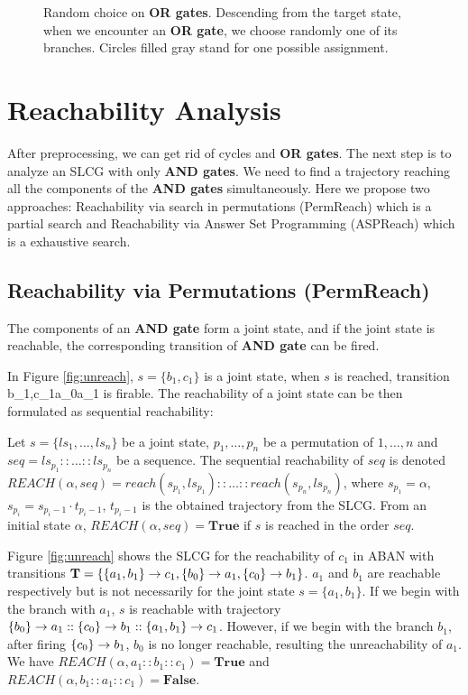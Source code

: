 \begin{figure}[ht]
    \centering
    
    \caption[Random choice on \textbf{OR gates}]{Random choice on \textbf{OR gates}. Descending from the target state, when we encounter an \textbf{OR gate}, we choose randomly one of its branches. Circles filled gray stand for one possible assignment.}
    \label{fig:heuristics}
\end{figure}

\section{Reachability Analysis}
After preprocessing, we can get rid of cycles and \textbf{OR gates}.
The next step is to analyze an SLCG with only \textbf{AND gates}.
We need to find a trajectory reaching all the components of the \textbf{AND gates} simultaneously.
Here we propose two approaches: Reachability via search in permutations (PermReach) which is a partial search and Reachability via Answer Set Programming (ASPReach) which is a exhaustive search.
\subsection{Reachability via Permutations (PermReach)}

The components of an \textbf{AND gate} form a joint state, and if the joint state is reachable, the corresponding transition of \textbf{AND gate} can be fired. 

In Figure \ref{fig:unreach}, $s=\{ b_1,c_1\}$ is a joint state, when $s$ is reached, transition \ac{b_1,c_1}{a_0}{a_1} is firable.
The reachability of a joint state can be then formulated as sequential reachability:
\begin{definition}
Let $s=\{ls_1,\ldots,ls_n\}$ be a joint state, $p_1,\ldots ,p_n$ be a permutation of $1,\ldots ,n$ and $seq=ls_{p_1}::\ldots::ls_{p_n}$ be a sequence.
The sequential reachability of $seq$ is denoted %
$REACH(\alpha,seq)=reach(s_{p_1},ls_{p_1})::\ldots::reach(s_{p_n},ls_{p_n})$, where $s_{p_1}=\alpha$, $s_{p_i}=s_{p_i-1}\cdot t_{p_i-1}$, $t_{p_i-1}$ is the obtained trajectory from the SLCG.
From an initial state $\alpha$, $REACH(\alpha,seq) = \mathbf{True}$ if $s$ is reached in the order $seq$.
\end{definition}

\begin{example}\label{example:order}
Figure \ref{fig:unreach} shows the SLCG for the reachability of $c_1$ in ABAN with transitions $\mathbf{T}=\{\acm{a_1,b_1}{c_0}{c_1},\acm{b_0}{a_0}{a_1},\acm{c_0}{b_0}{b_1}\}$.
$a_1$ and $b_1$ are reachable respectively but is not necessarily for the joint state $s=\{a_1,b_1\}$.
If we begin with the branch with $a_1$, $s$ is reachable with trajectory $\acm{b_0}{a_0}{a_1}::\acm{c_0}{b_0}{b_1}::\acm{a_1,b_1}{c_0}{c_1}$. 
However, if we begin with the branch $b_1$, after firing $\acm{c_0}{b_0}{b_1}$, $b_0$ is no longer reachable, resulting the unreachability of $a_1$.
We have $REACH(\alpha,a_1::b_1::c_1)=\mathbf{True}$ and $REACH(\alpha,b_1::a_1::c_1)=\mathbf{False}$.
\end{example}

